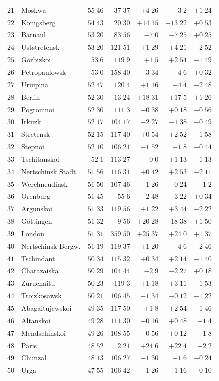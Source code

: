 \begin{center}
\begin{tabular}{rl|r|r||r|r|r}
$21$&Moskwa&$55\;46$&$37\;37$&$+4\;26$&$+3\;2$&$+1\;24$\\
$22$&Königsberg&$54\;43$&$20\;30$&$+14\;15$&$+13\;22$&$+0\;53$\\
$23$&Barnaul&$53\;20$&$83\;56$&$-7\;0$&$-7\;25$&$+0\;25$\\
$24$&Uststretensk&$53\;20$&$121\;51$&$+1\;29$&$+4\;21$&$-2\;52$\\
$25$&Gorbizkoi&$53\;6$&$119\;9$&$+1\;5$&$+2\;54$&$-1\;49$\\
$26$&Petropaulowsk&$53\;0$&$158\;40$&$-3\;34$&$-4\;6$&$+0\;32$\\
$27$&Uriupina&$52\;47$&$120\;4$&$+1\;16$&$+4\;4$&$-2\;48$\\
$28$&Berlin&$52\;30$&$13\;24$&$+18\;31$&$+17\;5$&$+1\;26$\\
$29$&Pogromnoi&$52\;30$&$111\;3$&$-0\;38$&$+0\;18$&$-0\;56$\\
$30$&Irkuzk&$52\;17$&$104\;17$&$-2\;27$&$-1\;38$&$-0\;49$\\[2pt]
$31$&Stretensk&$52\;15$&$117\;40$&$+0\;54$&$+2\;52$&$-1\;58$\\
$32$&Stepnoi&$52\;10$&$106\;21$&$-1\;52$&$-1\;8$&$-0\;44$\\
$33$&Tschitanskoi&$52\;1$&$113\;27$&$0\;0$&$+1\;13$&$-1\;13$\\
$34$&Nertschinsk Stadt&$51\;56$&$116\;31$&$+0\;42$&$+2\;53$&$-2\;11$\\
$35$&Werchneudinsk&$51\;50$&$107\;46$&$-1\;26$&$-0\;24$&$-1\;2$\\
$36$&Orenburg&$51\;45$&$55\;6$&$-2\;48$&$-3\;22$&$+0\;34$\\
$37$&Argunskoi&$51\;33$&$119\;56$&$+1\;22$&$+3\;44$&$-2\;22$\\
$38$&Göttingen&$51\;32$&$9\;56$&$+20\;28$&$+18\;38$&$+1\;50$\\
$39$&London&$51\;31$&$359\;50$&$+25\;37$&$+24\;0$&$+1\;37$\\
$40$&Nertschinsk Bergw.&$51\;19$&$119\;37$&$+1\;20$&$+4\;6$&$-2\;46$\\[2pt]
$41$&Tschindant&$50\;34$&$115\;32$&$+0\;34$&$+2\;14$&$-1\;40$\\
$42$&Charazaiska&$50\;29$&$104\;44$&$-2\;9$&$-2\;27$&$+0\;18$\\
$43$&Zuruchaitu&$50\;23$&$119\;3$&$+1\;18$&$+3\;11$&$-1\;53$\\
$44$&Troizkosawsk&$50\;21$&$106\;45$&$-1\;34$&$-0\;12$&$-1\;22$\\
$45$&Abagaitujewskoi&$49\;35$&$117\;50$&$+1\;8$&$+2\;54$&$-1\;46$\\
$46$&Altanskoi&$49\;28$&$111\;30$&$-0\;16$&$+0\;48$&$-1\;4$\\
$47$&Mendschinskoi&$49\;26$&$108\;55$&$-0\;56$&$+0\;12$&$-1\;8$\\
$48$&Paris&$48\;52$&$2\;21$&$+24\;6$&$+22\;4$&$+2\;2$\\
$49$&Chunzal&$48\;13$&$106\;27$&$-1\;30$&$-1\;6$&$-0\;24$\\
$50$&Urga&$47\;55$&$106\;42$&$-1\;26$&$-1\;16$&$-0\;10$\\
\hline
\end{tabular}
\end{center}
\endgroup

